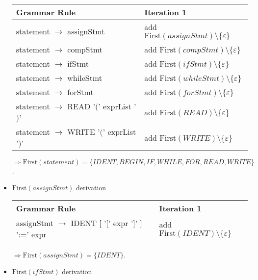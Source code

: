 \documentclass[8pt]{scrartcl}
\newcommand{\First}[1]{\mathrm{First}(#1)}
\newcommand{\epsset}{\{\varepsilon\}}
\begin{document}
\begin{itemize}
                \begin{tabular}{|l |l |}
                    \hline
                    \textbf{Grammar Rule} & \textbf{Iteration 1}\\
                    \hline
                    statement $\rightarrow$ assignStmt & add $\First{assignStmt} \setminus \epsset$\\
                    \hline
                    statement $\rightarrow$ compStmt & add $\First{compStmt} \setminus \epsset$\\
                    \hline
                    statement $\rightarrow$ ifStmt & add $\First{ifStmt} \setminus \epsset$\\
                    \hline
                    statement $\rightarrow$ whileStmt & add $\First{whileStmt} \setminus \epsset$\\
                    \hline
                    statement $\rightarrow$ forStmt & add $\First{forStmt} \setminus \epsset$\\
                    \hline
                    statement $\rightarrow$ READ '$($' exprList '$)$' & add $\First{READ} \setminus \epsset$\\
                    \hline
                    statement $\rightarrow$ WRITE '$($' exprList '$)$' & add $\First{WRITE} \setminus \epsset$\\
                    \hline
                \end{tabular}\newline
                $\Rightarrow \First{statement} = \{IDENT, BEGIN, IF, WHILE, FOR, READ, WRITE\}$.
            \item $\First{assignStmt}$ derivation\newline
                \begin{tabular}{|l |l |}
                    \hline
                    \textbf{Grammar Rule} & \textbf{Iteration 1}\\
                    \hline
                    assignStmt $\rightarrow$ IDENT [ '$[$' expr '$]$' ] ':=' expr & add $\First{IDENT} \setminus \epsset$\\
                    \hline
                \end{tabular}\newline
                $\Rightarrow \First{assignStmt} = \{IDENT\}$.
            \item $\First{ifStmt}$ derivation\newline
                \begin{tabular}{|l |l |}

\end{tabular}
\end{itemize}
\end{document}
